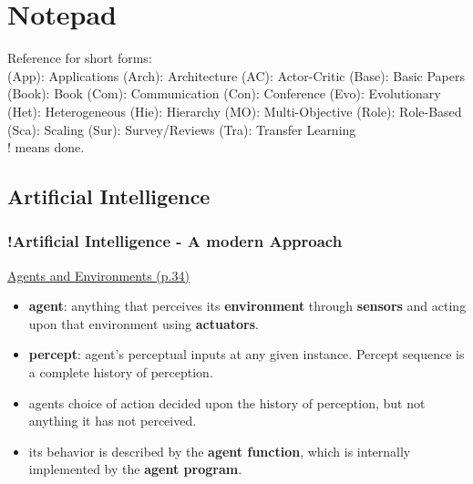 
\chapter{Notepad}
\label{ch:Notepad}

Reference for short forms: \\
(App): Applications
(Arch): Architecture
(AC): Actor-Critic
(Base): Basic Papers
(Book): Book
(Com): Communication
(Con): Conference
(Evo): Evolutionary
(Het): Heterogeneous
(Hie): Hierarchy
(MO): Multi-Objective
(Role): Role-Based
(Sca): Scaling
(Sur): Survey/Reviews
(Tra): Transfer Learning\\
! means done.

\section{Artificial Intelligence}
\subsection{!Artificial Intelligence - A modern Approach}
\underline{Agents and Environments (p.34)}
\begin{itemize}[noitemsep,nolistsep]
	\item \textbf{agent}: anything that perceives its \textbf{environment} through \textbf{sensors} and acting upon that environment using \textbf{actuators}.
	\item \textbf{percept}: agent’s perceptual inputs at any given instance. Percept sequence is a complete history of perception.
	\item agents choice of action decided upon the history of perception, but not anything it has not perceived.
	\item its behavior is described by the \textbf{agent function}, which is internally implemented by the \textbf{agent program}.
\end{itemize}


